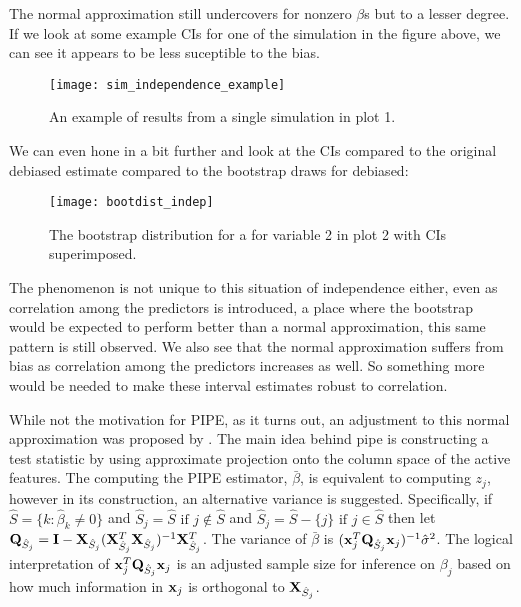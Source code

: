 The normal approximation still undercovers for nonzero $\beta$s but to a lesser degree. If we look at some example CIs for one of the simulation in the figure above, we can see it appears to be less suceptible to the bias.

\begin{figure}[hbtp]
    \begin{center}
    \texttt{[image: sim\_independence\_example]}
    \caption{\label{Fig:sim_independence_exaple} An example of results from a single simulation in plot 1.}
    \end{center}
\end{figure}

We can even hone in a bit further and look at the CIs compared to the original debiased estimate compared to the bootstrap draws for debiased:

\begin{figure}[hbtp]
    \begin{center}
    \texttt{[image: bootdist\_indep]}
    \caption{\label{Fig:bootdist_indep} The bootstrap distribution for a for variable 2 in plot 2 with CIs superimposed. }
    \end{center}
\end{figure}

The phenomenon is not unique to this situation of independence either, even as correlation among the predictors is introduced, a place where the bootstrap would be expected to perform better than a normal approximation, this same pattern is still observed. We also see that the normal approximation suffers from bias as correlation among the predictors increases as well. So something more would be needed to make these interval estimates robust to correlation. 

While not the motivation for PIPE, as it turns out, an adjustment to this normal approximation was proposed by . The main idea behind pipe is constructing a test statistic by using approximate projection onto the column space of the active features. The computing the PIPE estimator, $\bar{\beta}$, is equivalent to computing $z_j$, however in its construction, an alternative variance is suggested. Specifically, if $\hat{S} = \lbrace k: \hat{\beta}_k \neq  0 \rbrace$ and $\hat{S}_j = \hat{S} \text{ if } j \notin \hat{S}$ and $\hat{S}_j = \hat{S} - \lbrace j \rbrace \text{ if } j \in \hat{S}$  then let $\mathbf{Q}_{\hat{S}_j} = \mathbf{I} - \mathbf{X}_{\hat{S}_j}(\mathbf{X}_{\hat{S}_j}^T \mathbf{X}_{\hat{S}_j})^{-1} \mathbf{X}_{\hat{S}_j}^T$. The variance of $\bar{\beta}$ is $(\mathbf{x}_j^T \mathbf{Q}_{\hat{S}_j} \mathbf{x}_j)^{-1}\hat{\sigma}^2$. The logical interpretation of $\mathbf{x}_j^T \mathbf{Q}_{\hat{S}_j} \mathbf{x}_j$ is an adjusted sample size for inference on $\beta_j$ based on how much information in $\mathbf{x}_j$ is orthogonal to $\mathbf{X}_{\hat{S}_j}$. 

